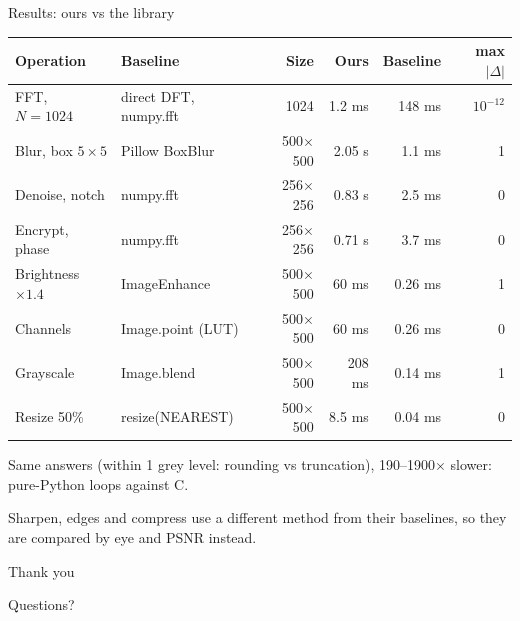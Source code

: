 \documentclass[9pt,aspectratio=169]{beamer}
\begin{document}
\begin{frame}{Results: ours vs the library}
\centering
{\small
\begin{tabular}{@{}llrrrr@{}}
  \toprule
  Operation & Baseline & Size & Ours & Baseline & max $|\Delta|$ \\
  \midrule
  FFT, $N = 1024$  & direct DFT, numpy.fft & 1024          & 1.2 ms  & 148 ms  & $10^{-12}$ \\
  Blur, box $5\times5$ & Pillow BoxBlur    & 500$\times$500 & 2.05 s  & 1.1 ms  & 1 \\
  Denoise, notch   & numpy.fft             & 256$\times$256 & 0.83 s  & 2.5 ms  & 0 \\
  Encrypt, phase   & numpy.fft             & 256$\times$256 & 0.71 s  & 3.7 ms  & 0 \\
  Brightness $\times1.4$ & ImageEnhance    & 500$\times$500 & 60 ms   & 0.26 ms & 1 \\
  Channels         & Image.point (LUT)     & 500$\times$500 & 60 ms   & 0.26 ms & 0 \\
  Grayscale        & Image.blend           & 500$\times$500 & 208 ms  & 0.14 ms & 1 \\
  Resize 50\%      & resize(NEAREST)       & 500$\times$500 & 8.5 ms  & 0.04 ms & 0 \\
  \bottomrule
\end{tabular}}

\vspace{1.2em}
\alert{Same answers} (within 1 grey level: rounding vs truncation),
\alert{190--1900$\times$ slower}: pure-Python loops against C.

\vspace{0.4em}
{\small\color{muted} Sharpen, edges and compress use a different method from their
baselines, so they are compared by eye and PSNR instead.}
\end{frame}

\begin{frame}[standout]
Thank you

\vspace{0.6em}
{\normalsize\mdseries Questions?}
\end{frame}

\end{document}
